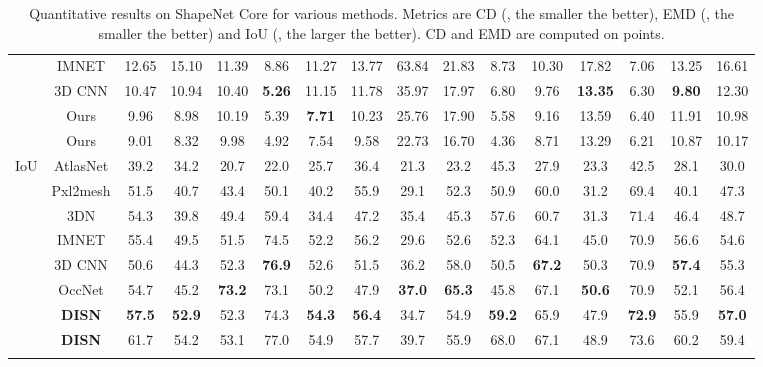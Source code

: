 \begin{table}[htb!]
\begin{tabular}{c|c|ccccccccccccc|c}
                     & IMNET     & 12.65 &    15.10 &    11.39 &    8.86  &    11.27 &    13.77   & 63.84 & 21.83   &    8.73  &    10.30 &    17.82 & 7.06     & 13.25 & 16.61       \\
                     & 3D CNN     & 10.47  & 10.94  & 10.40  & \textbf{5.26}  & 11.15  & 11.78  & 35.97  &  17.97 & 6.80 &  9.76  & \textbf{13.35}  & 6.30   &  \textbf{9.80}  & 12.30 \\
                     & Ours&  9.96    & 8.98    & 10.19 &    5.39 & \textbf{7.71}   &    10.23 & 25.76 &     17.90 & 5.58 &    9.16 & 13.59 &    6.40 & 11.91 & 10.98  \\
                     & Ours& 9.01    & 8.32  & 9.98  &    4.92  &    7.54  &    9.58  &    22.73 &     16.70 & 4.36 & 8.71 & 13.29 &    6.21    & 10.87 & 10.17  \\\hline
\multirow{7}{*}{IoU} & AtlasNet   & 39.2  & 34.2  & 20.7  & 22.0  & 25.7  & 36.4    & 21.3  & 23.2    & 45.3  & 27.9  & 23.3  & 42.5  & 28.1  & 30.0  \\
                     & Pxl2mesh & 51.5  & 40.7  & 43.4  & 50.1  & 40.2  & 55.9    & 29.1  & 52.3    & 50.9  & 60.0  & 31.2  & 69.4  & 40.1  & 47.3  \\
                     & 3DN        & 54.3  & 39.8  & 49.4  & 59.4  & 34.4  & 47.2    & 35.4  & 45.3    & 57.6  & 60.7  & 31.3  & 71.4  & 46.4  & 48.7  \\
                     & IMNET     & 55.4 & 49.5 & 51.5 & 74.5 & 52.2 & 56.2 & 29.6 & 52.6 &    52.3 &    64.1 &    45.0 &    70.9     & 56.6 & 54.6      \\
                     & 3D CNN     & 50.6 & 44.3 &    52.3 &    \textbf{76.9} &    52.6 &    51.5 &    36.2 &    58.0 &    50.5 &    \textbf{67.2} &    50.3 &    70.9    & \textbf{57.4} & 55.3     \\
                     & OccNet     & 54.7 & 45.2 &    \textbf{73.2} &    73.1 &    50.2 &    47.9 &    \textbf{37.0} &    \textbf{65.3} &    45.8 &    67.1 &    \textbf{50.6} &    70.9    & 52.1 & 56.4     \\
                     & \textbf{DISN}& \textbf{57.5} &    \textbf{52.9} &    52.3 &    74.3 &    \textbf{54.3} &    \textbf{56.4} &    34.7 &    54.9 &    \textbf{59.2} &    65.9 &    47.9 &    \textbf{72.9}    & 55.9 & \textbf{57.0}       \\
                     & \textbf{DISN} & 61.7 &    54.2 &    53.1 &    77.0 &    54.9 &    57.7 &    39.7 &    55.9 &    68.0 &    67.1 &    48.9 &    73.6    & 60.2 & 59.4      \\\hline
                \Xhline{2\arrayrulewidth}
\end{tabular}
\vspace{5pt}
\caption{Quantitative results on ShapeNet Core for various methods. Metrics are CD (, the smaller the better), EMD (, the smaller the better) and IoU (, the larger the better). CD and EMD are computed on  points.}
\label{tab:quant_main}
\vspace{-15pt}
\end{table}



